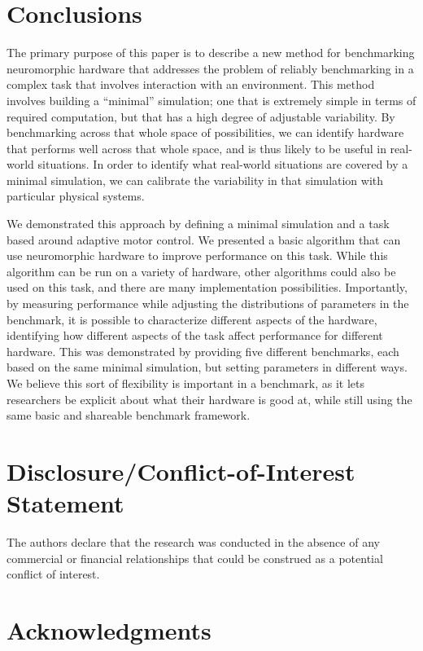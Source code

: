\documentclass{frontiersSCNS} %
\begin{document}
\section {Conclusions}

The primary purpose of this paper is to describe a new method for benchmarking
neuromorphic hardware that addresses the problem of reliably benchmarking
in a complex task that involves interaction with an environment.  This
method involves building a ``minimal'' simulation; one that is extremely
simple in terms of required computation, but that has a high degree of
adjustable variability.  By benchmarking across that whole space of
possibilities, we can identify hardware that performs well across that whole
space, and is thus likely to be useful in real-world situations.  In order
to identify what real-world situations are covered by a minimal simulation,
we can calibrate the variability in that simulation with particular physical
systems.

We demonstrated this approach by defining a minimal simulation and a task
based around adaptive motor control.  We presented a basic algorithm that
can use neuromorphic hardware to improve performance on this task.  While this
algorithm can be run on a variety of hardware, other algorithms could also
be used on this task, and there are many implementation possibilities.
Importantly, by measuring performance while adjusting the distributions of
parameters in the benchmark, it is possible to characterize different aspects
of the hardware, identifying how different aspects of the task affect
performance for different hardware.  This was demonstrated by providing
five different benchmarks, each based on the same minimal simulation, but
setting parameters in different ways.  We believe this sort of flexibility
is important in a benchmark, as it lets researchers be explicit about what
their hardware is good at, while still using the same basic and shareable
benchmark framework.

\section*{Disclosure/Conflict-of-Interest Statement}

The authors declare that the research was conducted in the absence of any commercial or financial relationships that could be construed as a potential conflict of interest.

\section*{Acknowledgments}
\end{document}
